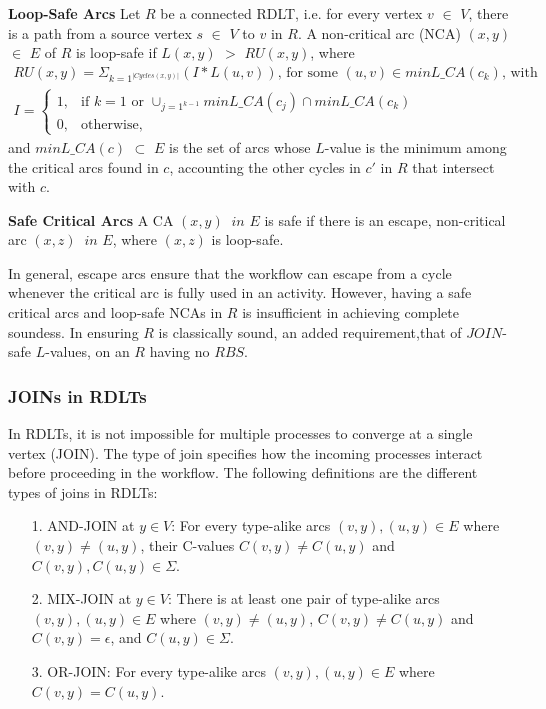 \begin{defn}\textbf{Loop-Safe Arcs} \cite{MalinaoPJS2023}
    \label{LSA}
    Let $ R $ be a connected RDLT, i.e. for every vertex $ v $ $ \in $ $ V $, there is a path from a source vertex $ s $ $ \in $ $ V $ to $ v $ in $ R $. A non-critical arc (NCA) $ (x,y) $ $ \in $ $ E $ of $ R $ is loop-safe if $ L(x,y) $ $ > $ $ RU(x,y) $, where
    \begin{gather*}
        RU(x,y) = \Sigma_{k=1^{|Cycles(x,y)|}} (I * L(u,v)) \text{, for some } (u,v) \in minL\_CA(c_k) \text{, with} \\
        I =
        \begin{cases}
            1, & \text{if } k = 1 \text{ or } \cup_{j=1^{k-1}} minL\_CA(c_j) \cap minL\_CA(c_k) \\
            0, & \text{otherwise,}
        \end{cases}
    \end{gather*}
    and $ minL\_CA(c) $ $ \subset $ $ E $ is the set of arcs whose $L$-value is the minimum among the critical arcs found in $ c $, accounting the other cycles in $ c' $ in $ R $ that intersect with $ c $.
\end{defn}

\begin{defn}\textbf{Safe Critical Arcs} \cite{MalinaoPJS2023}
    \label{SafeCA}
    A CA $ (x,y) $ $\ in $ $ E $ is safe if there is an escape, non-critical arc $ (x,z) $ $\ in $ $ E $, where $ (x,z) $ is loop-safe.
\end{defn}

In general, escape arcs ensure that the workflow can escape from a cycle whenever the critical arc is fully used in an activity. However, having a safe critical arcs and loop-safe NCAs in $R$ is insufficient in achieving complete soundess. In ensuring $R$ is classically sound, an added requirement,that of $JOIN$-safe $L$-values, on an $R$ having no $RBS$.

\subsubsection*{JOINs in RDLTs}
In RDLTs, it is not impossible for multiple processes to converge at a single vertex (JOIN). The type of join specifies how the incoming processes interact before proceeding in the workflow. The following definitions are the different types of joins in RDLTs:
\begin{itemize}
    \item[1.] AND-JOIN at $y \in V$: For every type-alike arcs $(v,y), (u,y) \in E$ where $(v,y) \neq (u,y)$, their C-values $C(v,y) \neq C(u,y)$ and $C(v,y),C(u,y) \in \Sigma$.
    \item[2.] MIX-JOIN at $y \in V$: There is at least one pair of type-alike arcs $(v,y), (u,y) \in E$ where $(v,y) \neq (u,y)$, $C(v,y) \neq C(u,y)$ and $C(v,y) = \epsilon$, and $C(u,y) \in \Sigma$.
    \item[3.] OR-JOIN: For every type-alike arcs $(v,y), (u,y) \in E$ where $C(v,y)=C(u,y)$.
\end{itemize}

